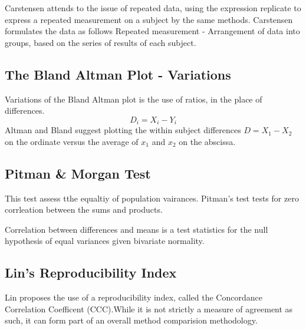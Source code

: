 \documentclass[Chap1main.tex]{subfiles}
\begin{document}
Carstensen attends to the issue of repeated data, using the
expression replicate to express a repeated measurement on a
subject by the same methods. Carstensen formulates the data as
follows Repeated measurement - Arrangement of data into groups,
based on the series of results of each subject.

\subsection{The Bland Altman Plot - Variations}
Variations of the Bland Altman plot is the use of ratios, in the
place of differences.
\begin{equation}
D_{i} = X_{i} - Y_{i}   \label{BA01}
\end{equation}
Altman and Bland suggest plotting the within subject differences $
D = X_{1} - X_{2} $ on the ordinate versus the average of $x_{1}$
and  $x_{2}$ on the abscissa.
\subsection{Pitman \& Morgan Test} This test assess tthe equaltiy
of population vairances. Pitman's test tests for zero corrleation
between the sums and products.

Correlation between differences and means is a test statistics for
the null hypothesis of equal variances given bivariate normality.
\subsection{Lin's Reproducibility Index} Lin proposes the use of a
reproducibility index, called the Concordance Correlation
Coefficent (CCC).While it is not strictly a measure of agreement
as such, it can form part of an overall method comparision
methodology.


\end{document}

